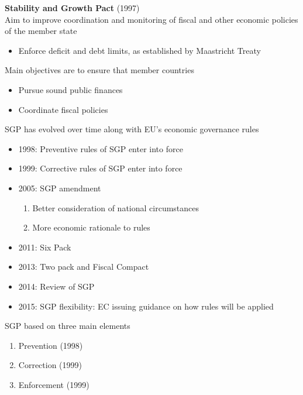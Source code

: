 \documentclass{beamer}
\begin{document}
\begin{frame}
  \textbf{Stability and Growth Pact} (1997)\\
  Aim to improve coordination and monitoring of fiscal and other economic policies of the member state
  \begin{itemize}
    \item Enforce deficit and debt limits, as established by Maastricht Treaty
  \end{itemize}
  \medskip
  Main objectives are to ensure that member countries
  \begin{itemize}
    \item Pursue sound public finances
    \item Coordinate fiscal policies
  \end{itemize}
\end{frame}

\begin{frame}
  SGP has evolved over time along with EU's economic governance rules
\begin{itemize}
  \item 1998: Preventive rules of SGP enter into force
  \item 1999: Corrective rules of SGP enter into force
  \item 2005: SGP amendment
  \begin{enumerate}
    \item Better consideration of national circumstances
    \item More economic rationale to rules
  \end{enumerate}
  \medskip  
  \item 2011: Six Pack 
  \item 2013: Two pack and Fiscal Compact
  \item 2014: Review of SGP
  \item 2015: SGP flexibility: EC issuing guidance on how rules will be applied
\end{itemize}
\end{frame}

\begin{frame}
  SGP based on three main elements
\begin{enumerate}
  \item Prevention (1998)
  \item Correction (1999)
  \item Enforcement (1999)
\end{enumerate}
\end{frame}
\end{document}
